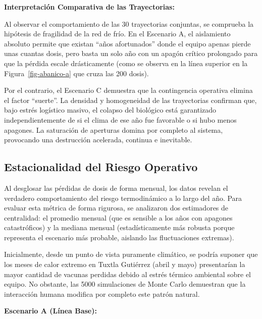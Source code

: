 \documentclass[
  spanish,
  us-letterpaper,
]{scrreprt}
\numberwithin{equation}{section}
\theoremstyle{plain}
\theoremstyle{plain}
\theoremstyle{plain}
\theoremstyle{definition}
\theoremstyle{remark}
\begin{document}
\textbf{Interpretación Comparativa de las Trayectorias:}

Al observar el comportamiento de las 30 trayectorias conjuntas, se
comprueba la hipótesis de fragilidad de la red de frío. En el Escenario
A, el aislamiento absoluto permite que existan ``años afortunados''
donde el equipo apenas pierde unas cuantas dosis, pero basta un solo año
con un apagón crítico prolongado para que la pérdida escale
drásticamente (como se observa en la línea superior en la
Figura~\ref{fig-abanico-a} que cruza las 200 dosis).

Por el contrario, el Escenario C demuestra que la contingencia operativa
elimina el factor ``suerte''. La densidad y homogeneidad de las
trayectorias confirman que, bajo estrés logístico masivo, el colapso del
biológico está garantizado independientemente de si el clima de ese año
fue favorable o si hubo menos apagones. La saturación de aperturas
domina por completo al sistema, provocando una destrucción acelerada,
continua e inevitable.

\subsection{Estacionalidad del Riesgo
Operativo}\label{estacionalidad-del-riesgo-operativo}

Al desglosar las pérdidas de dosis de forma mensual, los datos revelan
el verdadero comportamiento del riesgo termodinámico a lo largo del año.
Para evaluar esta métrica de forma rigurosa, se analizaron dos
estimadores de centralidad: el promedio mensual (que es sensible a los
años con apagones catastróficos) y la mediana mensual (estadísticamente
más robusta porque representa el escenario más probable, aislando las
fluctuaciones extremas).

Inicialmente, desde un punto de vista puramente climático, se podría
suponer que los meses de calor extremo en Tuxtla Gutiérrez (abril y
mayo) presentarían la mayor cantidad de vacunas perdidas debido al
estrés térmico ambiental sobre el equipo. No obstante, las 5000
simulaciones de Monte Carlo demuestran que la interacción humana
modifica por completo este patrón natural.

\textbf{Escenario A (Línea Base):}
\end{document}
